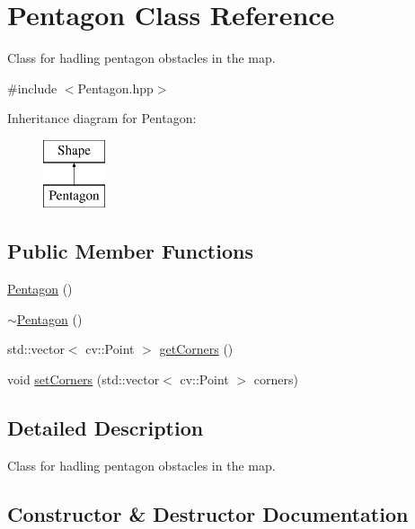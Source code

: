 \hypertarget{class_pentagon}{}\section{Pentagon Class Reference}
\label{class_pentagon}


Class for hadling pentagon obstacles in the map.  




{\ttfamily \#include $<$Pentagon.\+hpp$>$}

Inheritance diagram for Pentagon\+:\begin{figure}[H]
\begin{center}
\leavevmode
\includegraphics[height=2.000000cm]{class_pentagon}
\end{center}
\end{figure}
\subsection*{Public Member Functions}
\begin{DoxyCompactItemize}
\item 
\mbox{\hyperlink{class_pentagon_a1c5596d8ff548bfcdccc7fa53b81355c}{Pentagon}} ()
\item 
\mbox{\hyperlink{class_pentagon_a500031431177cee506fd7f0517d84753}{$\sim$\+Pentagon}} ()
\item 
std\+::vector$<$ cv\+::\+Point $>$ \mbox{\hyperlink{class_pentagon_ab38482973f796da34cd9ac62cefb1491}{get\+Corners}} ()
\item 
void \mbox{\hyperlink{class_pentagon_a42c8df4cbb1fcf985c96c9886a21c70a}{set\+Corners}} (std\+::vector$<$ cv\+::\+Point $>$ corners)
\end{DoxyCompactItemize}


\subsection{Detailed Description}
Class for hadling pentagon obstacles in the map. 

\subsection{Constructor \& Destructor Documentation}
\mbox{\label{class_pentagon_a1c5596d8ff548bfcdccc7fa53b81355c}} 
